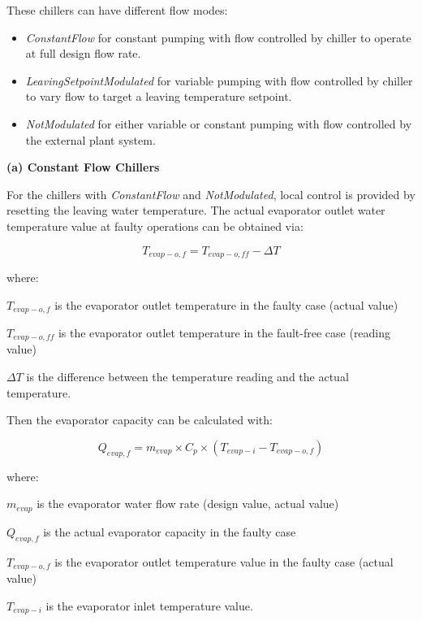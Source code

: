 These chillers can have different flow modes:

\begin{itemize}
\tightlist
\item
  \emph{ConstantFlow} for constant pumping with flow controlled by chiller to operate at full design flow rate.
\item
  \emph{LeavingSetpointModulated} for variable pumping with flow controlled by chiller to vary flow to target a leaving temperature setpoint.
\item
  \emph{NotModulated} for either variable or constant pumping with flow controlled by the external plant system.
\end{itemize}

\textbf{(a) Constant Flow Chillers}

For the chillers with \emph{ConstantFlow} and \emph{NotModulated}, local control is provided by resetting the leaving water temperature. The actual evaporator outlet water temperature value at faulty operations can be obtained via:

\begin{equation}
T_{evap-o,f} = T_{evap-o,ff} - \Delta T
\end{equation}

where:

\(T_{evap-o,f}\) is the evaporator outlet temperature in the faulty case (actual value)

\(T_{evap-o,ff}\) is the evaporator outlet temperature in the fault-free case (reading value)

\(\Delta T\) is the difference between the temperature reading and the actual temperature.

Then the evaporator capacity can be calculated with:

\begin{equation}
Q_{evap,f} = m_{evap} \times C_p \times (T_{evap-i} - T_{evap-o,f} )
\end{equation}

where:

\(m_{evap}\) is the evaporator water flow rate (design value, actual value)

\(Q_{evap,f}\) is the actual evaporator capacity in the faulty case

\(T_{evap-o,f}\) is the evaporator outlet temperature value in the faulty case (actual value)

\(T_{evap-i}\) is the evaporator inlet temperature value. \newline

